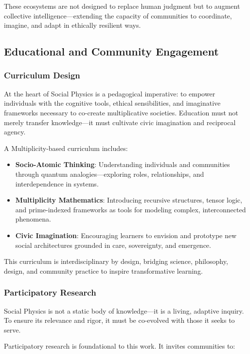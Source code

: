 \documentclass{article}
\theoremstyle{plain}
\theoremstyle{claimstyle}
\begin{document}
These ecosystems are not designed to replace human judgment but to augment collective intelligence—extending the capacity of communities to coordinate, imagine, and adapt in ethically resilient ways.

\subsection{Educational and Community Engagement}

\subsubsection{Curriculum Design}

At the heart of Social Physics is a pedagogical imperative: to empower individuals with the cognitive tools, ethical sensibilities, and imaginative frameworks necessary to co-create multiplicative societies. Education must not merely transfer knowledge—it must cultivate civic imagination and reciprocal agency.

A Multiplicity-based curriculum includes:

\begin{itemize}
    \item \textbf{Socio-Atomic Thinking}: Understanding individuals and communities through quantum analogies—exploring roles, relationships, and interdependence in systems.
    \item \textbf{Multiplicity Mathematics}: Introducing recursive structures, tensor logic, and prime-indexed frameworks as tools for modeling complex, interconnected phenomena.
    \item \textbf{Civic Imagination}: Encouraging learners to envision and prototype new social architectures grounded in care, sovereignty, and emergence.
\end{itemize}

This curriculum is interdisciplinary by design, bridging science, philosophy, design, and community practice to inspire transformative learning.

\subsubsection{Participatory Research}

Social Physics is not a static body of knowledge—it is a living, adaptive inquiry. To ensure its relevance and rigor, it must be co-evolved with those it seeks to serve.

Participatory research is foundational to this work. It invites communities to:
\end{document}
